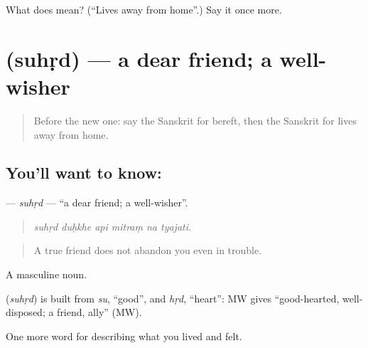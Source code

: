 \begin{tcolorbox}[breakable,colback=teal!4,colframe=teal!35!black,title={Before you move on}]
What does  mean? (\textquotedblleft{}Lives away from home\textquotedblright{}.) Say it once more.
\end{tcolorbox}
\section[\texorpdfstring{\sk{सुहृद्} (suhṛd)}{सुहृद् (suhṛd)}]{ (suhṛd) — a dear friend; a well-wisher}

\label{lesson:SA-C453-suhrd}



\begin{quote}
Before the new one: say the Sanskrit for bereft, then the Sanskrit for lives away from home.
\end{quote}

\subsection*{You'll want to know: }
\textbf{} — \emph{suhṛd} — \textquotedblleft{}a dear friend; a well-wisher\textquotedblright{}.

\begin{quote}
     
\end{quote}

\begin{quote}
\emph{suhṛd duḥkhe api mitraṃ na tyajati.}
\end{quote}

\begin{quote}
A true friend does not abandon you even in trouble.
\end{quote}

A masculine noun.

\begin{cousinweb}
\textbf{} (\emph{suhṛd}) is built from \emph{su}, \textquotedblleft{}good\textquotedblright{}, and \emph{hṛd}, \textquotedblleft{}heart\textquotedblright{}: MW gives \textquotedblleft{}good-hearted, well-disposed; a friend, ally\textquotedblright{} (MW).
\end{cousinweb}

\begin{grammarlens}[title={What you've built}]
One more word for describing what you lived and felt.
\end{grammarlens}

